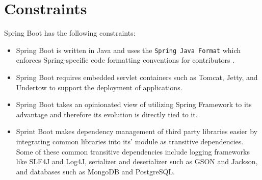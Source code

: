 \section{Constraints}

Spring Boot has the following constraints:

\begin{itemize}
\item Spring Boot is written in Java and uses the \texttt{Spring Java Format} which enforces Spring-specific code formatting conventions for contributors \cite{springBootContribution}.
\item Spring Boot requires embedded servlet containers such as Tomcat, Jetty, and Undertow to support the deployment of applications.
\item Spring Boot takes an opinionated view of utilizing Spring Framework to its advantage and therefore its evolution is directly tied to it.
\item Sprint Boot makes dependency management of third party libraries easier by integrating common libraries into its' module as transitive dependencies. Some of these common transitive dependencies include logging frameworks like SLF4J and Log4J, serializer and deserializer such as GSON and Jackson, and databases such as MongoDB and PostgreSQL.
\end{itemize}
